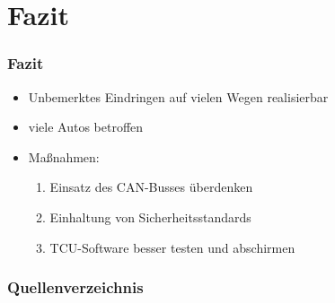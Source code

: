 \documentclass[t]{beamer}
\begin{document}
\section{Fazit}
\begin{frame}
	\frametitle{Fazit}
	\begin{itemize}
		\item Unbemerktes Eindringen auf vielen Wegen realisierbar
	\end{itemize}
    \begin{itemize}
		\item viele Autos betroffen
	\end{itemize}
    	\begin{itemize}
		\item Maßnahmen:
        	\begin{enumerate}
				\item Einsatz des CAN-Busses überdenken
                \item Einhaltung von Sicherheitsstandards
                \item TCU-Software besser testen und abschirmen
			\end{enumerate}
	\end{itemize}
\end{frame}

\begin{frame}[allowframebreaks]
    \frametitle{Quellenverzeichnis}
	\nocite{*}
	
	
\end{frame}
\end{document}
